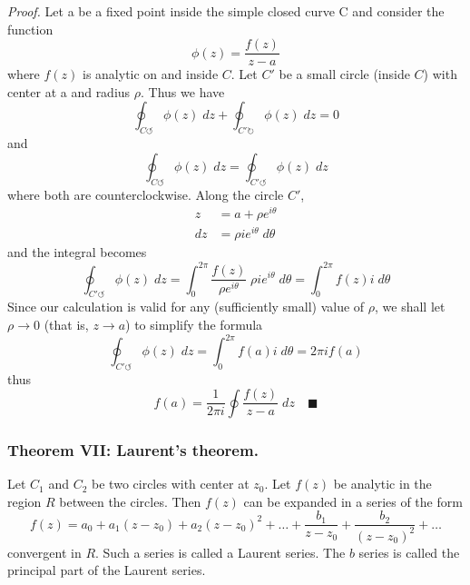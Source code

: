 \documentclass[../../../main.tex]{subfiles}
\begin{document}
\emph{Proof.} Let a be a ﬁxed point inside the simple closed curve C and consider the function
\begin{equation*}
    \phi(z)=\frac{f(z)}{z-a}
\end{equation*}
where $f(z)$ is analytic on and inside $C$. Let $C'$ be a small circle (inside $C$) with center at a and radius $\rho$. Thus we have 
\begin{equation*}
    \oint_{C\circlearrowleft} \phi(z)\;dz+\oint_{C'\circlearrowright} \phi(z)\;dz=0
\end{equation*}
and
\begin{equation*}
    \oint_{C\circlearrowleft} \phi(z)\;dz=\oint_{C'\circlearrowleft} \phi(z)\;dz
\end{equation*}
where both are counterclockwise. Along the circle $C'$,
\begin{align*}
    z&= a + \rho e^{i\theta}\\
    dz&=\rho i e^{i\theta}\;d\theta
\end{align*}
and the integral becomes
\begin{equation*}
    \oint_{C'\circlearrowleft} \phi(z)\;dz=\int_{0}^{2\pi} \frac{f(z)}{ \rho e^{i\theta}}\;\rho i e^{i\theta}\;d\theta=\int_{0}^{2\pi}f(z)i\;d\theta
\end{equation*}
Since our calculation is valid for any (sufficiently small) value of $\rho$, we shall let
$\rho\rightarrow0$ (that is, $z\rightarrow a$) to simplify the formula
\begin{equation*}
    \oint_{C'\circlearrowleft} \phi(z)\;dz=\int_{0}^{2\pi}f(a)i\;d\theta=2\pi if(a)
\end{equation*}
thus
\begin{equation*}
    f(a)=\frac{1}{2\pi i}\oint \frac{f(z)}{z-a}\;dz \quad \blacksquare
\end{equation*}

\subsubsection{Theorem VII: Laurent's theorem.} Let $C_1$ and $C_2$ be two circles with center at $z_0$. Let $f(z)$ be analytic in the region $R$ between the circles. Then $f(z)$ can be expanded in a series of the form
\begin{equation*}
    f(z) = a_0 + a_1(z - z_0) + a_2(z - z_0)^2+\dots+\frac{b_1}{z-z_0}+\frac{b_2}{(z-z_0)^2}+\dots
\end{equation*}
convergent in $R$. Such a series is called a Laurent series. The $b$ series is called the principal part of the Laurent series.
\end{document}
